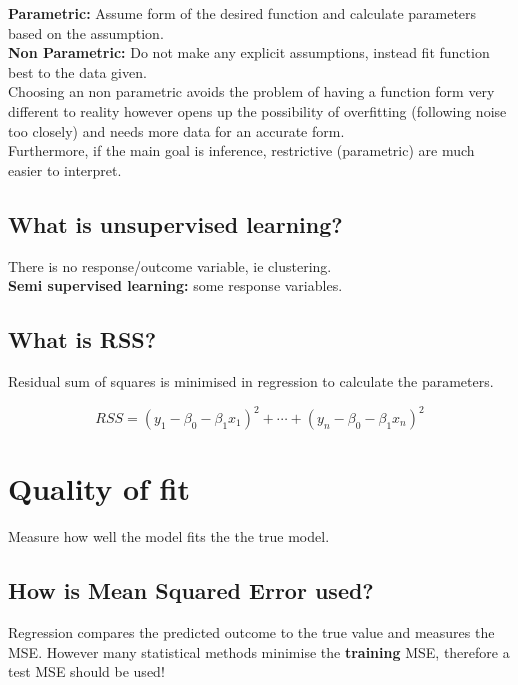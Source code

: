 \documentclass[11pt]{scrartcl} %
\begin{document}
\textbf{Parametric:} Assume form of the desired function and calculate parameters based on the assumption.\\

\textbf{Non Parametric:} Do not make any explicit assumptions, instead fit function best to the data given.\\

Choosing an non parametric avoids the problem of having a function form very different to reality however opens up
the possibility of overfitting (following noise too closely) and needs more data for an accurate form.\\

Furthermore, if the main goal is inference, restrictive (parametric) are much easier to interpret.

\subsection{What is unsupervised learning?}

There is no response/outcome variable, ie clustering.\\

\textbf{Semi supervised learning:} some response variables.

\subsection{What is RSS?}

Residual sum of squares is minimised in regression to calculate the parameters.

\begin{equation}
	RSS = (y_1-\beta_0-\beta_1x_1)^2 + \cdots +(y_n-\beta_0-\beta_1x_n)^2
\end{equation}

\section{Quality of fit}

Measure how well the model fits the the true model.

\subsection{How is Mean Squared Error used?}

Regression compares the predicted outcome to the true value and measures the MSE. However many
statistical methods minimise the \textbf{training} MSE, therefore a test MSE should be used!\\
\end{document}
